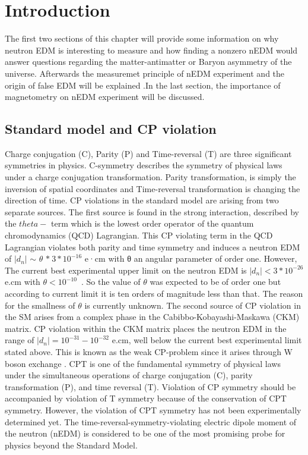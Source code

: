 \chapter{Introduction\label{ch:intro}}
\small
The first two sections of this chapter will provide some information on why neutron EDM is interesting to measure
and how finding a nonzero nEDM would answer questions regarding the matter-antimatter
or Baryon asymmetry of the universe. Afterwards the measuremet principle of nEDM experiment and the origin of false EDM will be explained .In the last section, the importance of magnetometry on nEDM experiment will be discussed. 
\section{Standard model and CP violation}
 Charge conjugation (C), Parity
(P) and Time-reversal (T) are three significant symmetries in physics. C-symmetry  describes the symmetry of physical laws under a charge  conjugation
transformation. Parity transformation, is simply the inversion of spatial coordinates
and Time-reversal transformation is changing the direction of time.
CP violations in the standard model are arising from two separate sources.  The first source is found in the strong interaction, described by the $theta-$ term which is the lowest order operator of the quantum chromodynamics (QCD) Lagrangian.  This CP violating term in the QCD Lagrangian violates both parity and time symmetry and induces a neutron EDM of $|d_n|$ $\sim$ $\theta$ $*~ 3 * 10^{−16}$ e·cm \cite{PhysRevLett.97.131801} with θ an angular parameter of order one.  However, The current best experimental upper limit on the neutron EDM is $|d_n| < 3*10^{−26}$ e.cm with $\theta <10^{-10}$~\cite{PhysRevD.92.092003}.  So the value of $\theta$ was expected to be of order one but according to current limit it is ten orders of magnitude less than that.  The reason for the smallness of $\theta$ is currently unknown. The second source of CP violation in the SM  arises from a complex phase in the Cabibbo-Kobayashi-Maskawa (CKM) matrix\cite{PhysRevLett.10.531}.  CP violation within the CKM matrix places the neutron EDM in the range of $|d_n| = 10^{-31} - 10^{-32}$ e.cm, well below the current best experimental limit stated above. This is known as the weak CP-problem since it arises through W boson exchange
\cite{PhysRevLett.82.904}. CPT is one of the fundamental symmetry of physical laws under the simultaneous operations of charge conjugation (C), parity transformation (P), and time reversal (T). Violation of CP symmetry should be accompanied by violation of T symmetry because of the conservation of CPT symmetry. However, the violation of CPT symmetry has not been experimentally determined yet. The time-reversal-symmetry-violating electric dipole
moment of the neutron (nEDM) is considered to be one of
the most promising probe for physics beyond
the Standard Model.

